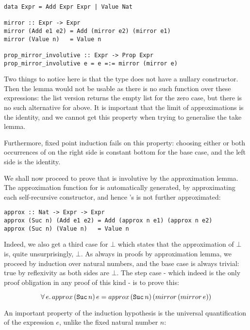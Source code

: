 \begin{verbatim}
data Expr = Add Expr Expr | Value Nat

mirror :: Expr -> Expr
mirror (Add e1 e2) = Add (mirror e2) (mirror e1)
mirror (Value n)   = Value n

prop_mirror_involutive :: Expr -> Prop Expr
prop_mirror_involutive e = e =:= mirror (mirror e)
\end{verbatim}

Two things to notice here is that the type  does not have a
nullary constructor. Then the  lemma would not be usable as
there is no such function over these expressions: the list version
returns the empty list \hs{[]} for the zero case, but there is no such
alternative for  above. It is important that the limit of
approximations is the identity, and we cannot get this property when
trying to generalise the take lemma.

Furthermore, fixed point induction fails on this property: choosing
either or both occurrences of  on the right side is
constant bottom for the base case, and the left side is the identity.


We shall now proceed to prove that  is involutive by the
approximation lemma. The approximation function for  is
automatically generated, by approximating each self-recursive
constructor, and hence 's  is not further approximated:

\begin{verbatim}
approx :: Nat -> Expr -> Expr
approx (Suc n) (Add e1 e2) = Add (approx n e1) (approx n e2)
approx (Suc n) (Value n)   = Value n
\end{verbatim}

Indeed, we also get a third case for $\bot$ which states that the
approximation of $\bot$ is, quite unsurprisingly, $\bot$.
As always in proofs by approximation lemma, we proceed by induction
over natural numbers, and the base case is always trivial: true by
reflexivity as both sides are $\bot$. The step case - which indeed is
the only proof obligation in any proof of this kind - is to prove
this:

\begin{equation*}
\fa{e}  approx \, (\hs{Suc} \, n) \, e = approx \, (\hs{Suc} \, n) \, (mirror \, (mirror \, e))
\end{equation*}

An important property of the induction hypothesis is the universal
quantification of the expression $e$, unlike the fixed natural number
$n$:

